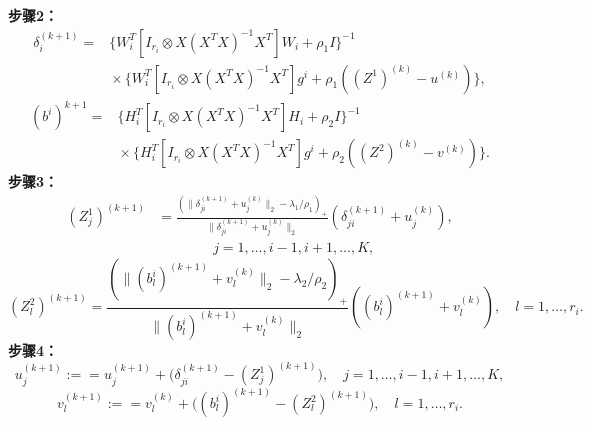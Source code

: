 \noindent\textbf{步骤2：}
\[
\begin{aligned}
\delta_i^{(k+1)}={}&
\{W_i^T[I_{r_i}\otimes X(X^TX)^{-1}X^T]W_i+\rho_1I\}^{-1}\\
&{}\times\{W_i^T[I_{r_i}\otimes X(X^TX)^{-1}X^T]g^i
+\rho_1((Z^1)^{(k)}-u^{(k)})\},
\end{aligned}
\]
\[
\begin{aligned}
(b^i)^{k+1}={}&
\{H_i^T[I_{r_i}\otimes X(X^TX)^{-1}X^T]H_i+\rho_2I\}^{-1}\\
&{}\times\{H_i^T[I_{r_i}\otimes X(X^TX)^{-1}X^T]g^i
+\rho_2((Z^2)^{(k)}-v^{(k)})\}.
\end{aligned}
\]
\noindent\textbf{步骤3：}
\[
\begin{aligned}
(Z_j^1)^{(k+1)}&=
\frac{(\|\delta_{ji}^{(k+1)}+u_j^{(k)}\|_2-\lambda_1/\rho_1)_+}{
\|\delta_{ji}^{(k+1)}+u_j^{(k)}\|_2}
(\delta_{ji}^{(k+1)}+u_j^{(k)}),\\
&\hspace{4em}j=1,\ldots,i-1,i+1,\ldots,K,
\end{aligned}
\]
\[
(Z_l^2)^{(k+1)}=
\frac{(\|(b_l^i)^{(k+1)}+v_l^{(k)}\|_2-\lambda_2/\rho_2)_+}{
\|(b_l^i)^{(k+1)}+v_l^{(k)}\|_2}
((b_l^i)^{(k+1)}+v_l^{(k)}),\quad l=1,\ldots,r_i.
\]
\noindent\textbf{步骤4：}
\[
u_j^{(k+1)}:==u_j^{(k+1)}+
\bigl(\delta_{ji}^{(k+1)}-(Z_j^1)^{(k+1)}\bigr),\quad
j=1,\ldots,i-1,i+1,\ldots,K,
\]
\[
v_l^{(k+1)}:==v_l^{(k)}+
\bigl((b_l^i)^{(k+1)}-(Z_l^2)^{(k+1)}\bigr),\quad l=1,\ldots,r_i.
\]
